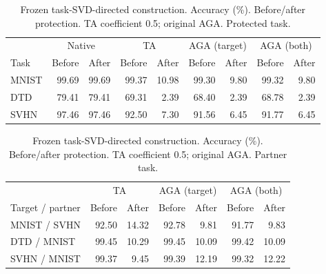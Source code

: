 \begin{table}[t]
\centering
\footnotesize
\setlength{\tabcolsep}{4pt}
\begin{tabular}{lrrrrrrrr}
\toprule
 & \multicolumn{2}{c}{Native} & \multicolumn{2}{c}{TA} & \multicolumn{2}{c}{AGA (target)} & \multicolumn{2}{c}{AGA (both)} \\
Task & Before & After & Before & After & Before & After & Before & After \\
\midrule
MNIST & 99.69 & 99.69 & 99.37 & 10.98 & 99.30 & 9.80 & 99.32 & 9.80 \\
DTD & 79.41 & 79.41 & 69.31 & 2.39 & 68.40 & 2.39 & 68.78 & 2.39 \\
SVHN & 97.46 & 97.46 & 92.50 & 7.30 & 91.56 & 6.45 & 91.77 & 6.45 \\
\bottomrule
\end{tabular}
\caption{Frozen task-SVD-directed construction. Accuracy (\%). Before/after protection. TA coefficient 0.5; original AGA. Protected task.}
\label{tab:taskdirected-target}
\end{table}

\begin{table}[t]
\centering
\footnotesize
\setlength{\tabcolsep}{4pt}
\begin{tabular}{lrrrrrr}
\toprule
 & \multicolumn{2}{c}{TA} & \multicolumn{2}{c}{AGA (target)} & \multicolumn{2}{c}{AGA (both)} \\
Target / partner & Before & After & Before & After & Before & After \\
\midrule
MNIST / SVHN & 92.50 & 14.32 & 92.78 & 9.81 & 91.77 & 9.83 \\
DTD / MNIST & 99.45 & 10.29 & 99.45 & 10.09 & 99.42 & 10.09 \\
SVHN / MNIST & 99.37 & 9.45 & 99.39 & 12.19 & 99.32 & 12.22 \\
\bottomrule
\end{tabular}
\caption{Frozen task-SVD-directed construction. Accuracy (\%). Before/after protection. TA coefficient 0.5; original AGA. Partner task.}
\label{tab:taskdirected-partner}
\end{table}
